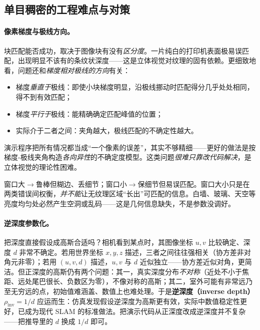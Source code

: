 \subsection{单目稠密的工程难点与对策}
\label{sec:dense-mono-pitfalls}

\paragraph{像素梯度与极线方向。}
块匹配能否成功，取决于图像块有没有\emph{区分度}。一片纯白的打印机表面极易误匹配，出现明显不该有的条纹状深度——这是立体视觉对纹理的固有依赖。更细致地看，问题还和\emph{梯度相对极线的方向}有关：
\begin{itemize}
  \item 梯度\emph{垂直于}极线：即使小块梯度明显，沿极线挪动时匹配得分几乎处处相同，得不到有效匹配；
  \item 梯度\emph{平行于}极线：能精确确定匹配峰值的位置；
  \item 实际介于二者之间：夹角越大，极线匹配的不确定性越大。
\end{itemize}
演示程序把所有情况都当成“一个像素的误差”，其实不够精细——更好的做法是按梯度-极线夹角构造\emph{各向异性}的不确定度模型。这类问题\emph{很难只靠改代码解决}，是立体视觉的理论性困难。

\begin{pitfall}
窗口大$\to$鲁棒但糊边、丢细节；窗口小$\to$保细节但易误匹配。窗口大小只是在两类错误间权衡，\emph{并不能}让无纹理区域“长出”可匹配的信息。白墙、玻璃、天空等亮度均匀处必然产生空洞或乱码——这是几何信息缺失，不是参数没调好。
\end{pitfall}

\paragraph{逆深度参数化。}
把深度直接假设成高斯合适吗？相机看到某点时，其图像坐标 $u,v$ 比较确定、深度 $d$ 非常不确定。若用世界坐标 $x,y,z$ 描述，三者之间往往强相关（协方差非对角元非零）；若用 $(u,v,d)$ 描述，$u,v$ 与 $d$ 近似独立——协方差近似对角，更简洁。但正深度的高斯仍有两个问题：其一，真实深度分布\emph{不对称}（近处不小于焦距、远处尾巴很长、负数区为零），不像对称的高斯；其二，室外可能有非常远乃至无穷远的点，初始值难涵盖、数值上也难处理。于是\textbf{逆深度（inverse depth）} $\rho_{\mathrm{inv}}=1/d$ 应运而生：仿真发现假设逆深度为高斯更有效，实际中数值稳定性更好，已成为现代 SLAM 的标准做法\cite{gaoxiang2019slam14}。把演示代码从正深度改成逆深度并不复杂——把推导里的 $d$ 换成 $1/d$ 即可。

